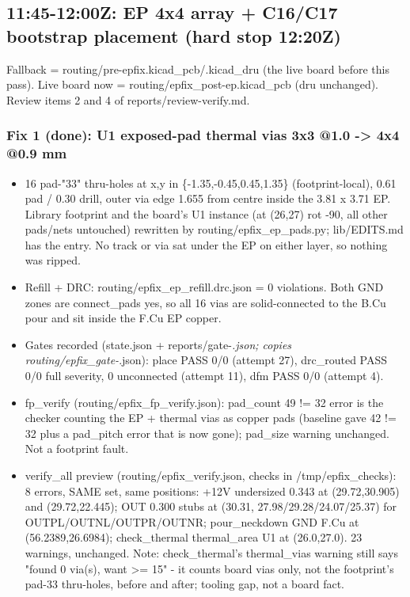 \documentclass[11pt]{article}
\begin{document}
\subsection*{11:45-12:00Z: EP 4x4 array + C16/C17 bootstrap placement (hard stop 12:20Z)}
Fallback = routing/pre-epfix.kicad\_pcb/.kicad\_dru (the live board before this pass). Live board now = routing/epfix\_post-ep.kicad\_pcb (dru unchanged). Review items 2 and 4 of reports/review-verify.md.

\subsubsection*{Fix 1 (done): U1 exposed-pad thermal vias 3x3 @1.0 -\textgreater{} 4x4 @0.9 mm}
\begin{itemize}
\item 16 pad-"33" thru-holes at x,y in \{-1.35,-0.45,0.45,1.35\} (footprint-local), 0.61 pad / 0.30 drill,
outer via edge 1.655 from centre inside the 3.81 x 3.71 EP. Library footprint and the board's U1
instance (at (26,27) rot -90, all other pads/nets untouched) rewritten by routing/epfix\_ep\_pads.py;
lib/EDITS.md has the entry. No track or via sat under the EP on either layer, so nothing was ripped.
\item Refill + DRC: routing/epfix\_ep\_refill.drc.json = 0 violations. Both GND zones are connect\_pads yes,
so all 16 vias are solid-connected to the B.Cu pour and sit inside the F.Cu EP copper.
\item Gates recorded (state.json + reports/gate-\emph{.json; copies routing/epfix\_gate-}.json): place PASS 0/0
(attempt 27), drc\_routed PASS 0/0 full severity, 0 unconnected (attempt 11), dfm PASS 0/0 (attempt 4).
\item fp\_verify (routing/epfix\_fp\_verify.json): pad\_count 49 != 32 error is the checker counting the EP +
thermal vias as copper pads (baseline gave 42 != 32 plus a pad\_pitch error that is now gone);
pad\_size warning unchanged. Not a footprint fault.
\item verify\_all preview (routing/epfix\_verify.json, checks in /tmp/epfix\_checks): 8 errors, SAME set,
same positions: +12V undersized 0.343 at (29.72,30.905) and (29.72,22.445); OUT 0.300 stubs at
(30.31, 27.98/29.28/24.07/25.37) for OUTPL/OUTNL/OUTPR/OUTNR; pour\_neckdown GND F.Cu at
(56.2389,26.6984); check\_thermal thermal\_area U1 at (26.0,27.0). 23 warnings, unchanged.
Note: check\_thermal's thermal\_vias warning still says "found 0 via(s), want \textgreater{}= 15" - it counts board
vias only, not the footprint's pad-33 thru-holes, before and after; tooling gap, not a board fact.
\end{itemize}
\end{document}
